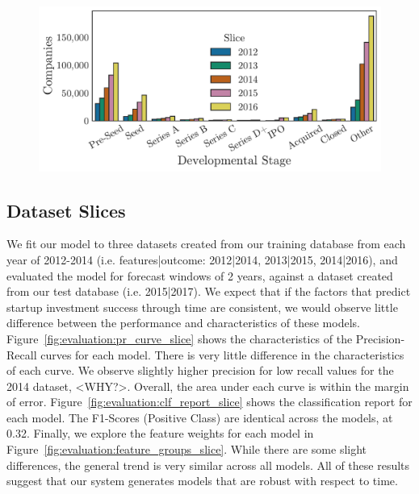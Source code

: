 \documentclass[../thesis/thesis.tex]{subfiles}
\begin{document}
\begin{figure}[!htb]
    \centering
    \includegraphics[width=\textwidth]{../figures/evaluation/slice_counts_over_time}
    \caption[Dataset counts over time]{} %
    \label{fig:evaluation:slice_counts_over_time}
\end{figure}

\subsection{Dataset Slices}

We fit our model to three datasets created from our training database from each year of 2012-2014 (i.e. features|outcome: 2012|2014, 2013|2015, 2014|2016), and evaluated the model for forecast windows of 2 years, against a dataset created from our test database (i.e. 2015|2017). We expect that if the factors that predict startup investment success through time are consistent, we would observe little difference between the performance and characteristics of these models. Figure~\ref{fig:evaluation:pr_curve_slice} shows the characteristics of the Precision-Recall curves for each model. There is very little difference in the characteristics of each curve. We observe slightly higher precision for low recall values for the 2014 dataset, <WHY?>. Overall, the area under each curve is within the margin of error. Figure~\ref{fig:evaluation:clf_report_slice} shows the classification report for each model. The F1-Scores (Positive Class) are identical across the models, at 0.32. Finally, we explore the feature weights for each model in Figure~\ref{fig:evaluation:feature_groups_slice}. While there are some slight differences, the general trend is very similar across all models. All of these results suggest that our system generates models that are robust with respect to time.
\end{document}
